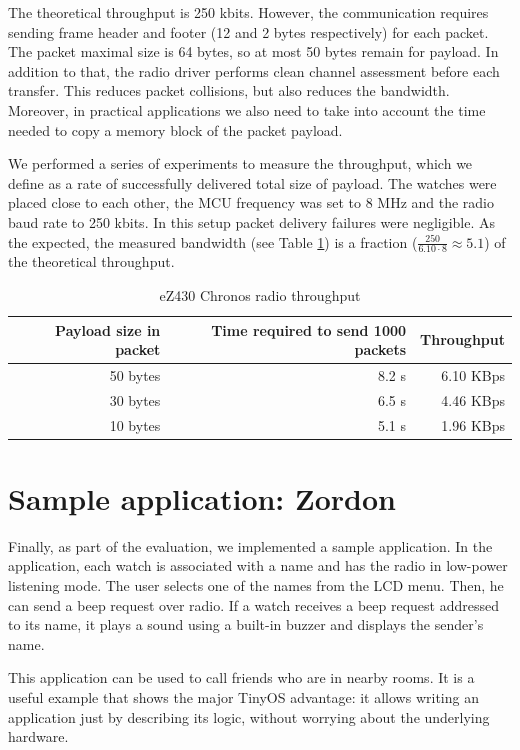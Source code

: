 The theoretical throughput is 250 kbits.
However, the communication requires sending frame header and footer (12 and 2 bytes respectively) for each packet.
The packet maximal size is 64 bytes, so at most 50 bytes remain for payload.
In addition to that, the radio driver performs clean channel assessment before each transfer.
This reduces packet collisions, but also reduces the bandwidth.
Moreover, in practical applications we also need to take into account the time needed to copy a memory block of the packet payload.


We performed a series of experiments to measure the throughput, which we define as a rate of successfully delivered total size of payload.
The watches were placed close to each other, the MCU frequency was set to 8 MHz and the radio baud rate to 250 kbits.
In this setup packet delivery failures were negligible.
As the expected, the measured bandwidth (see Table \ref{tab:radio-throughput}) is a fraction ($\frac{250}{6.10 \cdot 8} \approx 5.1$) of the theoretical throughput.

\begin{table}[h]
  \centering
    \begin{tabular}{|r|r|r|}
        \hline
        \textbf{Payload size in packet} & \textbf{Time required to send 1000 packets} & \textbf{Throughput} \\ \hline
        50 bytes& 8.2 s & 6.10 KBps \\ \hline
        30 bytes& 6.5 s & 4.46 KBps \\ \hline
        10 bytes& 5.1 s & 1.96 KBps \\ \hline
    \end{tabular}
  \caption{eZ430 Chronos radio throughput}
  \label{tab:radio-throughput}
\end{table}



\section{Sample application: Zordon}

Finally, as part of the evaluation, we implemented a sample application.
In the application, each watch is associated with a name and has the radio in low-power listening mode.
The user selects one of the names from the LCD menu.
Then, he can send a beep request over radio.
If a watch receives a beep request addressed to its name, it plays a sound using a built-in buzzer and displays the sender's name.

This application can be used to call friends who are in nearby rooms.
It is a useful example that shows the major TinyOS advantage: it allows writing an application just by describing its logic, without worrying about the underlying hardware.






